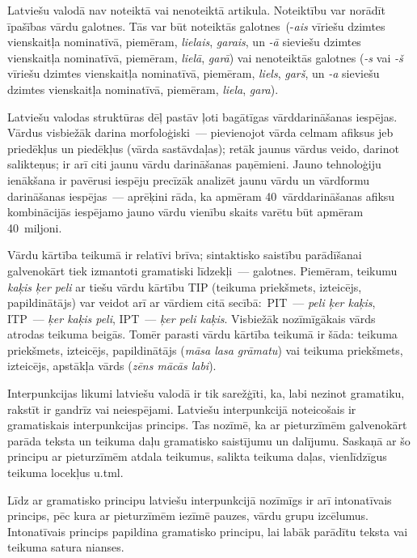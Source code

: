 \begin{multicols}{2}
Latviešu valodā nav noteiktā vai nenoteiktā artikula.
Noteiktību var norādīt īpašības vārdu galotnes.
Tās var būt noteiktās galotnes~(-\textit{ais} vīriešu dzimtes vienskaitļa nominatīvā, piemēram, \textit{lielais}, \textit{garais}, un \textit{-ā} sieviešu dzimtes vienskaitļa nominatīvā, piemēram, \textit{lielā}, \textit{garā}) vai nenoteiktās galotnes (\textit{-s} vai \textit{-š} vīriešu dzimtes vienskaitļa nominatīvā, piemēram, \textit{liels}, \textit{garš}, un \textit{-a} sieviešu dzimtes vienskaitļa nominatīvā, piemēram, \textit{liela}, \textit{gara}).

Latviešu valodas struktūras dēļ pastāv ļoti bagātīgas vārddarināšanas iespējas.  Vārdus visbiežāk darina morfoloģiski~--- pievienojot vārda celmam afiksus jeb priedēkļus un piedēkļus (vārda sastāvdaļas); retāk jaunus vārdus veido, darinot salikteņus; ir arī citi jaunu vārdu darināšanas paņēmieni.  Jauno tehnoloģiju ienākšana ir pavērusi iespēju precīzāk analizēt jaunu vārdu un vārdformu darināšanas iespējas~--- aprēķini rāda, ka apmēram 40~vārddarināšanas afiksu kombinācijās iespējamo jauno vārdu vienību skaits varētu būt apmēram 40~miljoni.


Vārdu kārtība teikumā ir relatīvi brīva; sintaktisko saistību parādīšanai galvenokārt tiek izmantoti gramatiski līdzekļi~--- galotnes.  Piemēram, teikumu \textit{kaķis ķer peli} ar tiešu vārdu kārtību TIP (teikuma priekšmets, izteicējs, papildinātājs) var veidot arī ar vārdiem citā secībā:~PIT~--- \textit{peli ķer kaķis}, ITP~--- \textit{ķer kaķis peli}, IPT~--- \textit{ķer peli kaķis}.  Visbiežāk nozīmīgākais vārds atrodas teikuma beigās.  Tomēr parasti vārdu kārtība teikumā ir šāda: teikuma priekšmets, izteicējs, papildinātājs (\textit{māsa lasa grāmatu}) vai teikuma priekšmets, izteicējs, apstākļa vārds (\textit{zēns mācās labi}).

Interpunkcijas likumi latviešu valodā ir tik sarežģīti, ka, labi nezinot gramatiku, rakstīt ir gandrīz vai \mbox{neiespējami}.  Latviešu interpunkcijā noteicošais ir gramatiskais interpunkcijas princips.  Tas nozīmē, ka ar pieturzīmēm galvenokārt parāda teksta un teikuma daļu gramatisko saistījumu un dalījumu.  Saskaņā ar šo principu ar pieturzīmēm atdala teikumus, salikta teikuma daļas, vienlīdzīgus teikuma locekļus u.tml.

Līdz ar gramatisko principu latviešu interpunkcijā nozīmīgs ir arī intonatīvais princips, pēc kura ar pieturzīmēm iezīmē pauzes, vārdu grupu izcēlumus.
Intonatīvais princips papildina gramatisko principu, lai labāk parādītu teksta vai teikuma satura nianses.


\end{multicols}
